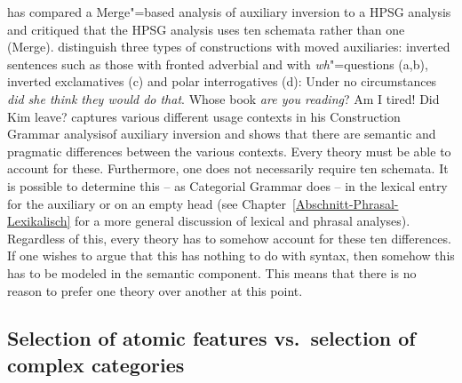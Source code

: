 \citet{Chomsky2010a} has compared a Merge"=based analysis of auxiliary inversion to a HPSG analysis and critiqued that the HPSG analysis uses ten schemata rather than
one (Merge). \citet{GSag2000a-u} distinguish three types of constructions with moved auxiliaries:
inverted sentences such as those with fronted adverbial and with \emph{wh}"=questions (a,b), inverted
exclamatives (c) and polar interrogatives (d):
\eal
\ex Under no circumstances \emph{did she think they would do that}.
\ex Whose book \emph{are you reading}?
\ex Am I tired!
\ex Did Kim leave?
\zl
\addlines
\citet{Fillmore99a} captures various different usage contexts in his Construction Grammar analysis\indexcxg of
auxiliary inversion and shows that there are semantic and pragmatic differences between the various contexts. Every
theory must be able to account for these. Furthermore, one does not necessarily require ten schemata. It is possible
to determine this -- as Categorial Grammar does -- in the lexical entry for the auxiliary or on an empty head (see
Chapter~\ref{Abschnitt-Phrasal-Lexikalisch} for a more general discussion of lexical and phrasal analyses). Regardless of
this, every theory has to somehow account for these ten differences. If one wishes to argue that this has nothing to
do with syntax, then somehow this has to be modeled in the semantic component. This means that there is no reason
to prefer one theory over another at this point.


\subsection{Selection of atomic features vs.\ selection of complex categories}
\label{sec-selection-features-vs-categories}

